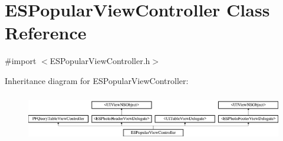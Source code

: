 \hypertarget{interface_e_s_popular_view_controller}{}\section{E\+S\+Popular\+View\+Controller Class Reference}
\label{interface_e_s_popular_view_controller}


{\ttfamily \#import $<$E\+S\+Popular\+View\+Controller.\+h$>$}

Inheritance diagram for E\+S\+Popular\+View\+Controller\+:\begin{figure}[H]
\begin{center}
\leavevmode
\includegraphics[height=2.079208cm]{interface_e_s_popular_view_controller}
\end{center}
\end{figure}
